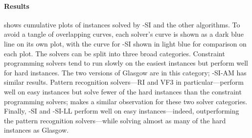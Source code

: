 \paragraph*{Results}

 shows cumulative plots of instances solved by \McSplit-SI
and the other algorithms.  To avoid a tangle of overlapping curves, each solver's curve is shown as a dark
blue line on its own plot, with the curve for \McSplit-SI shown in light blue for comparison on each
plot.  The solvers can be split into three broad categories.  Constraint programming solvers tend
to run slowly on the easiest instances but perform well for hard instances.  The two versions of Glasgow
are in this category; \McSplit-SI-AM has similar results.  Pattern recognition solvers---RI and VF3
in particular---perform well on easy instances but solve fewer of the hard instances than the constraint
programming solvers;
\citet{DBLP:conf/gbrpr/Solnon19} makes a similar observation for these two solver categories.
Finally, \McSplit-SI and \McSplit-SI-LL perform well on easy instances---indeed, outperforming
the pattern recognition solvers---while solving almost as many of the hard instances as Glasgow.

